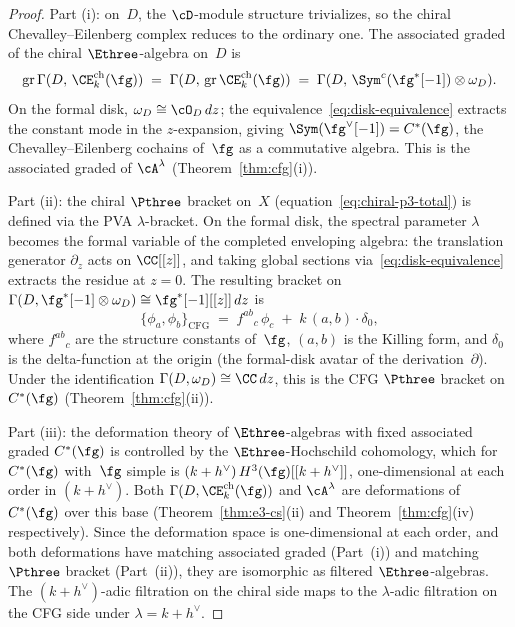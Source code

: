 \begin{proof}
Part (i): on~$D$, the $\cD$-module structure trivializes,
so the chiral Chevalley--Eilenberg complex reduces to the
ordinary one. The associated graded of the chiral
$\Ethree$-algebra on~$D$ is
\[
  \mathrm{gr}\,\Gamma(D,\, \CE^{\mathrm{ch}}_k(\fg))
  \;=\;
  \Gamma(D,\, \mathrm{gr}\,\CE^{\mathrm{ch}}_k(\fg))
  \;=\;
  \Gamma(D,\, \Sym^c(\fg^*[-1]) \otimes \omega_D).
\]
On the formal disk, $\omega_D \cong \cO_D\,dz$; the
equivalence~\eqref{eq:disk-equivalence} extracts the
constant mode in the $z$-expansion, giving
$\Sym(\fg^\vee[-1]) = C^*(\fg)$, the
Chevalley--Eilenberg cochains of~$\fg$ as a commutative
algebra. This is the associated graded of $\cA^\lambda$
(Theorem~\ref{thm:cfg}(i)).

Part (ii): the chiral $\Pthree$ bracket on~$X$
(equation~\eqref{eq:chiral-p3-total}) is defined via the
PVA $\lambda$-bracket. On the formal disk, the spectral
parameter $\lambda$ becomes the formal variable of the
completed enveloping algebra: the translation generator
$\partial_z$ acts on $\CC[[z]]$, and taking global sections
via~\eqref{eq:disk-equivalence} extracts the residue at
$z = 0$. The resulting bracket on
$\Gamma(D, \fg^*[-1] \otimes \omega_D)
\cong \fg^*[-1][[z]]\,dz$ is
\[
  \{\phi_a, \phi_b\}_{\mathrm{CFG}}
  \;=\;
  f^{ab}{}_{c}\,\phi_c
  \;+\;
  k\,(a,b) \cdot \delta_0,
\]
where $f^{ab}{}_{c}$ are the structure constants of~$\fg$,
$(a,b)$ is the Killing form, and $\delta_0$ is the
delta-function at the origin (the formal-disk avatar of the
derivation~$\partial$). Under the identification
$\Gamma(D, \omega_D) \cong \CC\,dz$, this is the CFG
$\Pthree$ bracket on $C^*(\fg)$
(Theorem~\ref{thm:cfg}(ii)).

Part (iii): the deformation theory of $\Ethree$-algebras
with fixed associated graded $C^*(\fg)$ is controlled by
the $\Ethree$-Hochschild cohomology, which for
$C^*(\fg)$ with~$\fg$ simple is
$(k+h^\vee)\,H^3(\fg)[[k+h^\vee]]$, one-dimensional at each
order in $(k+h^\vee)$. Both
$\Gamma(D, \CE^{\mathrm{ch}}_k(\fg))$ and
$\cA^\lambda$ are deformations of $C^*(\fg)$ over this
base (Theorem~\ref{thm:e3-cs}(ii) and
Theorem~\ref{thm:cfg}(iv) respectively). Since the
deformation space is one-dimensional at each order, and
both deformations have matching associated graded
(Part~(i)) and matching $\Pthree$ bracket (Part~(ii)),
they are isomorphic as filtered $\Ethree$-algebras.
The $(k+h^\vee)$-adic filtration on the chiral side maps to
the $\lambda$-adic filtration on the CFG side under
$\lambda = k + h^\vee$.
\end{proof}

